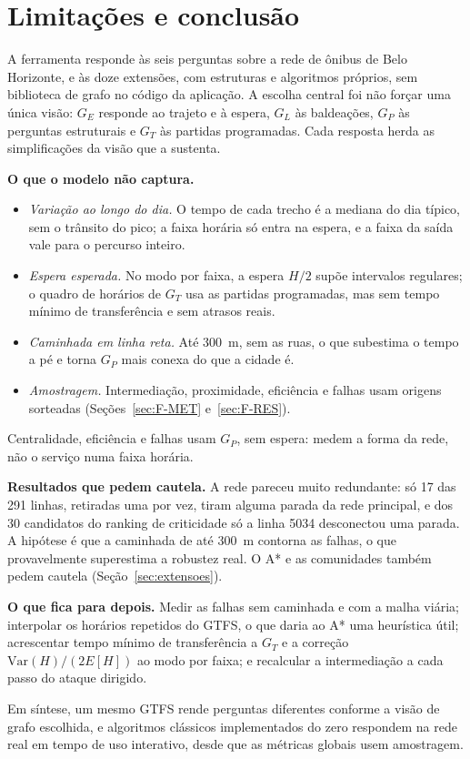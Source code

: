 \section{Limitações e conclusão}\label{sec:conclusao}

A ferramenta responde às seis perguntas sobre a rede de ônibus de Belo Horizonte, e às doze
extensões, com estruturas e algoritmos próprios, sem biblioteca de grafo no código da aplicação.
A escolha central foi não forçar uma única visão: $G_E$ responde ao trajeto e à espera, $G_L$ às
baldeações, $G_P$ às perguntas estruturais e $G_T$ às partidas programadas. Cada resposta herda
as simplificações da visão que a sustenta.

\textbf{O que o modelo não captura.}
\begin{itemize}
  \setlength{\itemsep}{0pt}
  \item \emph{Variação ao longo do dia.} O tempo de cada trecho é a mediana do dia típico, sem o
  trânsito do pico; a faixa horária só entra na espera, e a faixa da saída vale para o percurso
  inteiro.
  \item \emph{Espera esperada.} No modo por faixa, a espera $H/2$ supõe intervalos regulares; o
  quadro de horários de $G_T$ usa as partidas programadas, mas sem tempo mínimo de transferência
  e sem atrasos reais.
  \item \emph{Caminhada em linha reta.} Até 300~m, sem as ruas, o que subestima o tempo a pé e
  torna $G_P$ mais conexa do que a cidade é.
  \item \emph{Amostragem.} Intermediação, proximidade, eficiência e falhas usam origens sorteadas
  (Seções~\ref{sec:F-MET} e~\ref{sec:F-RES}).
\end{itemize}
Centralidade, eficiência e falhas usam $G_P$, sem espera: medem a forma da rede, não o serviço
numa faixa horária.

\textbf{Resultados que pedem cautela.} A rede pareceu muito redundante: só 17 das 291 linhas,
retiradas uma por vez, tiram alguma parada da rede principal, e dos 30 candidatos do ranking de
criticidade só a linha 5034 desconectou uma parada. A hipótese é que a caminhada de até 300~m contorna
as falhas, o que provavelmente superestima a robustez real. O A* e as comunidades também pedem
cautela (Seção~\ref{sec:extensoes}).

\textbf{O que fica para depois.} Medir as falhas sem caminhada e com a malha viária; interpolar
os horários repetidos do GTFS, o que daria ao A* uma heurística útil; acrescentar tempo mínimo
de transferência a $G_T$ e a correção $\mathrm{Var}(H)/(2E[H])$ ao modo por faixa; e
recalcular a intermediação a cada passo do ataque dirigido.

Em síntese, um mesmo GTFS rende perguntas diferentes conforme a visão de grafo escolhida, e
algoritmos clássicos implementados do zero respondem na rede real em tempo de uso interativo,
desde que as métricas globais usem amostragem.
